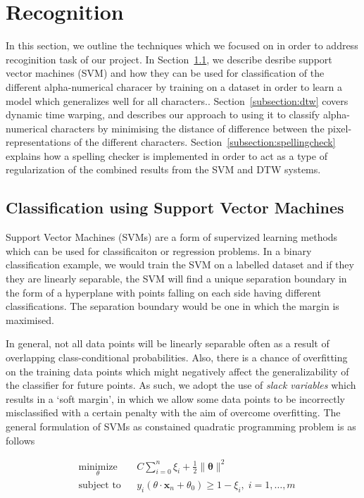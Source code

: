\documentclass[12pt]{article}
\begin{document}
\section{Recognition}
\label{section:recognition}
	In this section, we outline the techniques which we focused on in order to address recoginition task of our project. In Section~\ref{subsection:svm}, we describe desribe support vector machines (SVM) and how they can be used for classification of the different alpha-numerical characer by training on a dataset in order to learn a model which generalizes well for all characters.. Section~\ref{subsection:dtw} covers dynamic time warping, and describes our approach to using it to classify alpha-numerical characters by minimising the distance of difference between the pixel-representations of the different characters. Section~\ref{subsection:spellingcheck} explains how a spelling checker is implemented in order to act as a type of regularization of the combined results from the SVM and DTW systems.

	\subsection{Classification using Support Vector Machines}	
	\label{subsection:svm}
	Support Vector Machines (SVMs) are a form of supervized learning methods which can be used for classificaiton or regression problems. In a binary classification example, we would train the SVM on a labelled dataset and if they they are linearly separable, the SVM will find a unique separation boundary in the form of a hyperplane with points falling on each side having different classifications. The separation boundary would be one in which the margin is maximised. 

	In general, not all data points will be linearly separable often as a result of overlapping class-conditional probabilities. Also, there is a chance of overfitting on the training data points which might negatively affect the generalizability of the classifier for future points. As such, we adopt the use of \textit{slack variables} which results in a `soft margin', in which we allow some data points to be incorrectly misclassified with a certain penalty with the aim of overcome overfitting. The general formulation of SVMs as constained quadratic programming problem is as follows

	\begin{equation*}
	\label{equation:svm}
	\begin{aligned}
	& \underset{\theta}{\text{minimize}}
	& & C\sum_{i=0}^n\xi_{i} + \frac{1}{2} \parallel\mathbf{\theta}\parallel^{2}  \\
	& \text{subject to}
	& & y_{i}(\theta\cdot\mathbf{x}_{n}+\theta_{0}) \ge 1 - \xi_{i}, \; i = 1, \ldots, m
	\end{aligned}
	\end{equation*}
\end{document}
